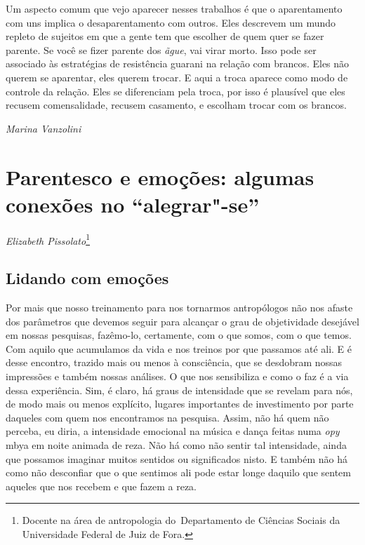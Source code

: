 Um aspecto comum que vejo aparecer nesses trabalhos é que o
aparentamento com uns implica o desaparentamento com outros. Eles
descrevem um mundo repleto de sujeitos em que a gente tem que escolher
de quem quer se fazer parente. Se você se fizer parente dos \emph{ãgue}, vai
virar morto. Isso pode ser associado às estratégias de resistência
guarani na relação com brancos. Eles não querem se aparentar, eles
querem trocar. E aqui a troca aparece como modo de controle da relação.
Eles se diferenciam pela troca, por isso é plausível que eles recusem
comensalidade, recusem casamento, e escolham trocar com os brancos.
\medskip
\begin{flushright}
\emph{Marina Vanzolini}
\end{flushright}

\chapter{Parentesco e emoções: algumas conexões no
``alegrar"-se''}
\begin{flushright}
\emph{Elizabeth Pissolato}\footnote{Docente na área de antropologia
do~Departamento de Ciências Sociais da Universidade Federal de Juiz de
Fora.}
\end{flushright}

\section{Lidando com emoções}

Por mais que nosso treinamento para nos tornarmos antropólogos não nos
afaste dos parâmetros que devemos seguir para alcançar o grau de
objetividade desejável em nossas pesquisas, fazêmo-lo, certamente, com
o que somos, com o que temos. Com aquilo que acumulamos da vida e nos
treinos por que passamos até ali. E é desse encontro, trazido mais ou
menos à consciência, que se desdobram nossas impressões e também nossas
análises. O que nos sensibiliza e como o faz é a via dessa experiência.
Sim, é claro, há graus de intensidade que se revelam para nós, de modo
mais ou menos explícito, lugares importantes de investimento por parte
daqueles com quem nos encontramos na pesquisa. Assim, não há quem não
perceba, eu diria, a intensidade emocional na música e dança feitas
numa \emph{opy} mbya em noite animada de reza. Não há como não sentir tal
intensidade, ainda que possamos imaginar muitos sentidos ou
significados nisto. E também não há como não desconfiar que o que
sentimos ali pode estar longe daquilo que sentem aqueles que nos
recebem e que fazem a reza.

